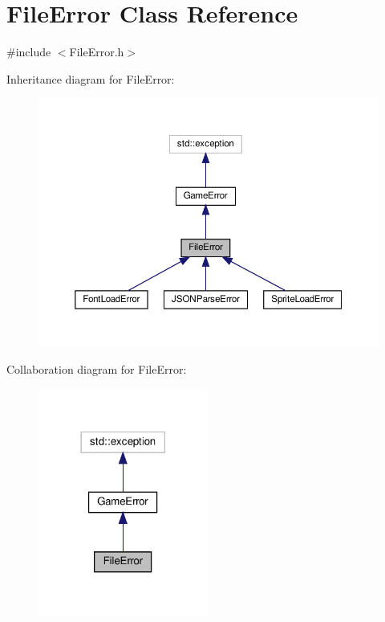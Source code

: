 \hypertarget{classFileError}{}\section{File\+Error Class Reference}
\label{classFileError}


{\ttfamily \#include $<$File\+Error.\+h$>$}



Inheritance diagram for File\+Error\+:\nopagebreak
\begin{figure}[H]
\begin{center}
\leavevmode
\includegraphics[width=350pt]{classFileError__inherit__graph}
\end{center}
\end{figure}


Collaboration diagram for File\+Error\+:\nopagebreak
\begin{figure}[H]
\begin{center}
\leavevmode
\includegraphics[width=158pt]{classFileError__coll__graph}
\end{center}
\end{figure}

